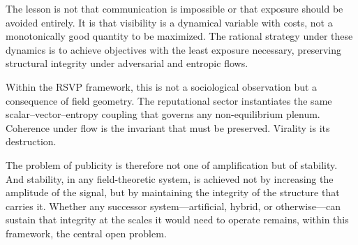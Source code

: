 \documentclass[12pt,a4paper]{article}
\begin{document}
The lesson is not that communication is impossible or that exposure should be avoided entirely. It is that visibility is a dynamical variable with costs, not a monotonically good quantity to be maximized. The rational strategy under these dynamics is to achieve objectives with the least exposure necessary, preserving structural integrity under adversarial and entropic flows.

Within the RSVP framework, this is not a sociological observation but a consequence of field geometry. The reputational sector instantiates the same scalar--vector--entropy coupling that governs any non-equilibrium plenum. Coherence under flow is the invariant that must be preserved. Virality is its destruction.

The problem of publicity is therefore not one of amplification but of stability. And stability, in any field-theoretic system, is achieved not by increasing the amplitude of the signal, but by maintaining the integrity of the structure that carries it. Whether any successor system---artificial, hybrid, or otherwise---can sustain that integrity at the scales it would need to operate remains, within this framework, the central open problem.

\newpage
\end{document}

